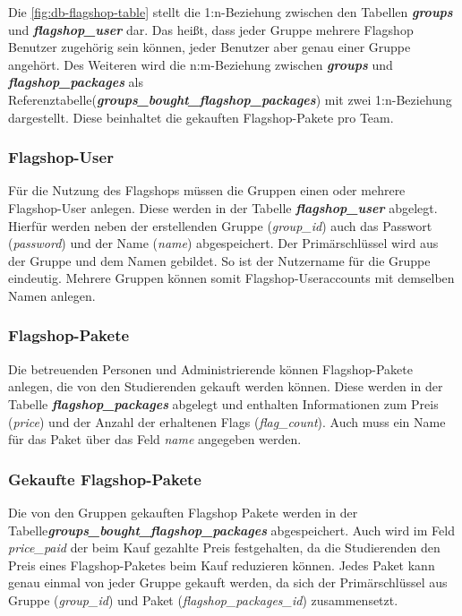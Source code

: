 Die \autoref{fig:db-flagshop-table} stellt die 1:n-Beziehung zwischen den Tabellen \textbf{\textit{groups}} und \textbf{\textit{flagshop\_user}} dar. Das heißt, dass jeder Gruppe mehrere Flagshop Benutzer zugehörig sein können, jeder Benutzer aber genau einer Gruppe angehört. Des Weiteren wird die n:m-Beziehung zwischen \textbf{\textit{groups}} und \textbf{\textit{flagshop\_packages}} als Referenztabelle\linebreak (\textbf{\textit{groups\_bought\_flagshop\_packages}}) mit zwei 1:n-Beziehung dargestellt. Diese beinhaltet die gekauften Flagshop-Pakete pro Team.

\subsubsection{Flagshop-User}
Für die Nutzung des Flagshops müssen die Gruppen einen oder mehrere Flagshop-User anlegen. Diese werden in der Tabelle \textbf{\textit{flagshop\_user}} abgelegt. Hierfür werden neben der erstellenden Gruppe (\textit{group\_id}) auch das Passwort (\textit{password}) und der Name (\textit{name}) abgespeichert. Der Primärschlüssel wird aus der Gruppe und dem Namen gebildet. So ist der Nutzername für die Gruppe eindeutig. Mehrere Gruppen können somit Flagshop-Useraccounts mit demselben Namen anlegen.

\subsubsection{Flagshop-Pakete}
Die betreuenden Personen und Administrierende können Flagshop-Pakete anlegen, die von den Studierenden gekauft werden können. Diese werden in der Tabelle \textbf{\textit{flagshop\_packages}} abgelegt und enthalten Informationen zum Preis (\textit{price}) und der Anzahl der erhaltenen Flags (\textit{flag\_count}). Auch muss ein Name für das Paket über das Feld \textit{name} angegeben werden.

\subsubsection{Gekaufte Flagshop-Pakete}
Die von den Gruppen gekauften Flagshop Pakete werden in der Tabelle\linebreak \textbf{\textit{groups\_bought\_flagshop\_packages}} abgespeichert. Auch wird im Feld \textit{price\_paid} der beim Kauf gezahlte Preis festgehalten, da die Studierenden den Preis eines Flagshop-Paketes beim Kauf reduzieren können. Jedes Paket kann genau einmal von jeder Gruppe gekauft werden, da sich der Primärschlüssel aus Gruppe (\textit{group\_id}) und Paket (\textit{flagshop\_packages\_id}) zusammensetzt.

